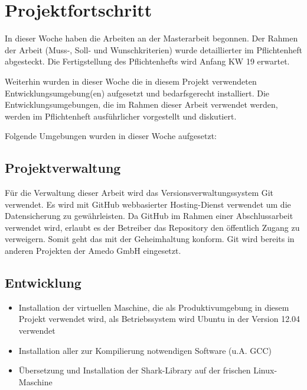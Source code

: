 \documentclass[a4paper,12pt,fleqn]{scrartcl}
\begin{document}
\section[Fortschritt]{Projektfortschritt}
In dieser Woche haben die Arbeiten an der Masterarbeit begonnen. Der Rahmen der Arbeit (Muss-, Soll- und Wunschkriterien)
wurde detaillierter im Pflichtenheft abgesteckt. Die Fertigstellung des Pflichtenhefts wird Anfang KW 19 erwartet.

Weiterhin wurden in dieser Woche die in diesem Projekt verwendeten Entwicklungsumgebung(en) aufgesetzt und bedarfsgerecht
installiert. Die Entwicklungsumgebungen, die im Rahmen dieser Arbeit verwendet werden, werden im Pflichtenheft ausführlicher vorgestellt und diskutiert.

Folgende Umgebungen wurden in dieser Woche aufgesetzt:

\subsection{Projektverwaltung}
Für die Verwaltung dieser Arbeit wird das Versionsverwaltungssystem Git verwendet. Es wird mit GitHub \cite{github} webbasierter
Hosting-Dienst verwendet um die Datensicherung zu gewährleisten. Da GitHub im Rahmen einer Abschlussarbeit verwendet wird, erlaubt
es der Betreiber das Repository den öffentlich Zugang zu verweigern. Somit geht das mit der Geheimhaltung konform. Git wird bereits
in anderen Projekten der Amedo GmbH eingesetzt.

\subsection{Entwicklung}
\begin{itemize}
  \item Installation der virtuellen Maschine, die als Produktivumgebung in
      diesem Projekt verwendet wird, als Betriebssystem wird Ubuntu in der Version 12.04 verwendet
  \item Installation aller zur Kompilierung notwendigen Software (u.A. GCC)
  \item Übersetzung und Installation der Shark-Library auf der frischen
      Linux-Maschine
\end{itemize}

\end{document}
